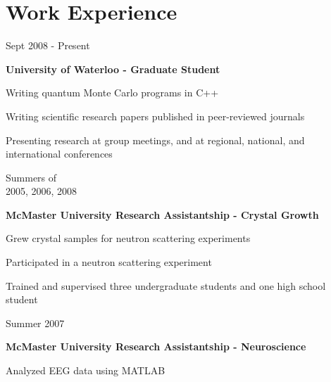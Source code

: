 \documentclass[letterpaper]{article}
\renewenvironment{itemize}{
  \begin{list}{}{
    \setlength{\leftmargin}{1.5em}
  }
}{
  \end{list}
}
\begin{document}
\section*{Work Experience}
\begin{itemize}
\item 
	\begin{minipage}[t]{0.23\linewidth}
 	Sept 2008 - Present 
	\end{minipage}
	\begin{minipage}[t]{0.72\linewidth}
	{\bf University of Waterloo - Graduate Student}
		\begin{itemize}
		\item Writing quantum Monte Carlo programs in C++
		\item Writing scientific research papers published in peer-reviewed journals
		\item Presenting research at group meetings, and at regional, national, and international conferences
		\end{itemize}
\end{minipage}
\item 
	\begin{minipage}[t]{0.23\linewidth}
 	Summers of\\
	2005, 2006, 2008
	\end{minipage}
	\begin{minipage}[t]{0.77\linewidth}
	{\bf McMaster University Research Assistantship - Crystal Growth}
		\begin{itemize}
		\item Grew crystal samples for neutron scattering experiments
		\item Participated in a neutron scattering experiment
		\item Trained and supervised three undergraduate students and one high school student
		\end{itemize}
\end{minipage}
\item 
	\begin{minipage}[t]{0.23\linewidth}
 	Summer 2007
	\end{minipage}
	\begin{minipage}[t]{0.72\linewidth}
	{\bf McMaster University Research Assistantship - Neuroscience}
		\begin{itemize}
		\item Analyzed EEG data using MATLAB
		\end{itemize}
\end{minipage}
\end{itemize}
\end{document}

